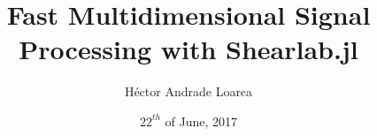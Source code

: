 \title[Fast Multidimensional Signal Processing with Shearlab.jl]{Fast Multidimensional Signal Processing with Shearlab.jl}
\author{H\'ector Andrade Loarca}
\date{$22^{th}$ of June, 2017}

\newcommand{\mylogo}{\texttt{[image: Images/bms-logo-button.png]}}

\begin{frame}[plain]
	\titlepage
\end{frame}

